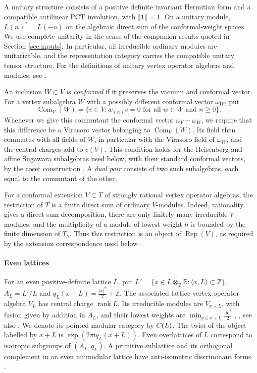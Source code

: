 \documentclass[leqno]{article}
\let\cal\relax
\newcommand{\cal}{\mathcal}
\newcommand{\Z}{\ensuremath{\mathbb{Z}}}
\newcommand{\R}{\ensuremath{\mathbb{R}}}
\renewcommand{\geq}{\ensuremath{\geqslant}}
\newcommand{\norm}[1]{\left\Vert#1\right\Vert}
\newcommand{\ot}{\otimes}
\DeclareMathOperator{\rank}{rank}
\DeclareMathOperator{\Rep}{Rep}
\numberwithin{equation}{section}
\begin{document}
A unitary structure consists of a positive definite invariant Hermitian form and a compatible antilinear PCT involution, with $\norm{\mathbf1} = 1$. On a unitary module, $L(n)^* = L(-n)$ on the algebraic direct sum of the conformal-weight spaces. We use complete unitarity in the sense of the companion results quoted in Section \ref{sec:inputs}. In particular, all irreducible ordinary modules are unitarizable, and the representation category carries the compatible unitary tensor structure. For the definitions of unitary vertex operator algebras and modules, see \cite[Section 5]{CKLW18}.

An inclusion $W \subset V$ is \emph{conformal} if it preserves the vacuum and conformal vector. For a vertex subalgebra $W$ with a possibly different conformal vector $\omega_W$, put
\[
\operatorname{Com}_V(W) = \{v \in V:w_{(n)}v = 0\text{ for all }w \in W\text{ and }n \geq 0\}.
\]
Whenever we give this commutant the conformal vector $\omega_V-\omega_W$, we require that this difference be a Virasoro vector belonging to $\operatorname{Com}_V(W)$. Its field then commutes with all fields of $W$, in particular with the Virasoro field of $\omega_W$, and the central charges add to $c(V)$. This condition holds for the Heisenberg and affine Sugawara subalgebras used below, with their standard conformal vectors, by the coset construction \cite{FZ92}. A \emph{dual pair} consists of two such subalgebras, each equal to the commutant of the other.

For a conformal extension $V \subset T$ of strongly rational vertex operator algebras, the restriction of $T$ is a finite direct sum of ordinary $V$-modules. Indeed, rationality gives a direct-sum decomposition, there are only finitely many irreducible $V$-modules, and the multiplicity of a module of lowest weight $h$ is bounded by the finite dimension of $T_h$. Thus this restriction is an object of $\Rep(V)$, as required by the extension correspondence used below \cite{HKL15}.

\paragraph{Even lattices}
For an even positive-definite lattice $L$, put $L' = \{x \in L \ot_\Z\R:\langle x,L\rangle \subset \Z\}$, $A_L = L'/L$ and $q_L(x+L) = \frac{|x|^2}{2}+\Z$. The associated lattice vertex operator algebra $V_L$ has central charge $\rank L$. Its irreducible modules are $V_{x+L}$, with fusion given by addition in $A_L$, and their lowest weights are $\min_{y \in x+L}\frac{|y|^2}{2}$ \cite[Chapter 8]{FLM88}, \cite{Don93}, see also \cite[Theorem 6.5.1 p.~240 and Theorem 6.5.20 p.~259]{LL04}. We denote its pointed modular category by $\cal C(L)$. The twist of the object labelled by $x+L$ is $\exp(2\pi\mathrm i q_L(x+L))$. Even overlattices of $L$ correspond to isotropic subgroups of $(A_L,q_L)$. A primitive sublattice and its orthogonal complement in an even unimodular lattice have anti-isometric discriminant forms \cite{Nik80}.
\end{document}
